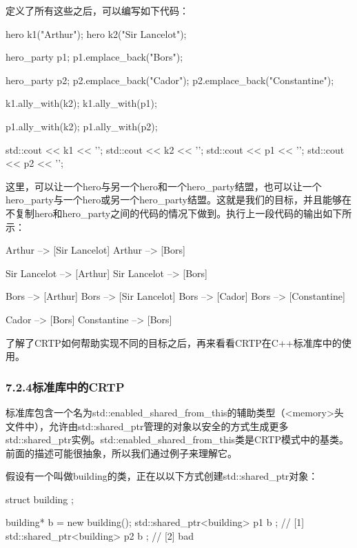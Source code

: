 定义了所有这些之后，可以编写如下代码：

\begin{cpp}
hero k1("Arthur");
hero k2("Sir Lancelot");

hero_party p1;
p1.emplace_back("Bors");

hero_party p2;
p2.emplace_back("Cador");
p2.emplace_back("Constantine");

k1.ally_with(k2);
k1.ally_with(p1);

p1.ally_with(k2);
p1.ally_with(p2);

std::cout << k1 << '\n';
std::cout << k2 << '\n';
std::cout << p1 << '\n';
std::cout << p2 << '\n';
\end{cpp}

这里，可以让一个hero与另一个hero和一个hero\_party结盟，也可以让一个hero\_party与一个hero或另一个hero\_party结盟。这就是我们的目标，并且能够在不复制hero和hero\_party之间的代码的情况下做到。执行上一段代码的输出如下所示：

\begin{shell}
Arthur --> [Sir Lancelot]
Arthur --> [Bors]

Sir Lancelot --> [Arthur]
Sir Lancelot --> [Bors]

Bors --> [Arthur]
Bors --> [Sir Lancelot]
Bors --> [Cador]
Bors --> [Constantine]

Cador --> [Bors]
Constantine --> [Bors]
\end{shell}

了解了CRTP如何帮助实现不同的目标之后，再来看看CRTP在C++标准库中的使用。

\subsubsection{7.2.4\hspace{0.2cm}标准库中的CRTP}

标准库包含一个名为std::enabled\_shared\_from\_this的辅助类型（<memory>头文件中），允许由std::shared\_ptr管理的对象以安全的方式生成更多std::shared\_ptr实例。std::enabled\_shared\_from\_this类是CRTP模式中的基类。前面的描述可能很抽象，所以我们通过例子来理解它。

假设有一个叫做building的类，正在以以下方式创建std::shared\_ptr对象：

\begin{cpp}
struct building {};

building* b = new building();
std::shared_ptr<building> p1{ b }; // [1]
std::shared_ptr<building> p2{ b }; // [2] bad
\end{cpp}

